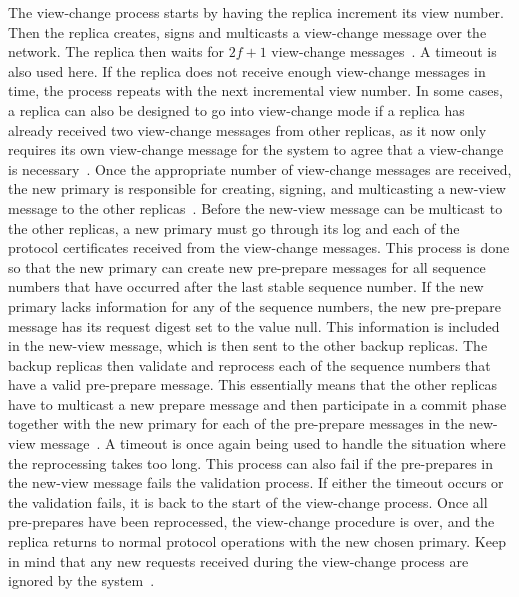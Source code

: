 The view-change process starts by having the replica increment its view number. Then the replica creates, signs and multicasts a view-change message over the network. The replica  then waits for $2f+1$ view-change messages~\cites{SLIDES:PBFT}[p.~6]{PAPER:OGPBFT}[p.~411]{PAPER:PBFTRecovery}{WEB:SawtoothPBFT}. A timeout is also used here. If the replica does not receive enough view-change messages in time, the process repeats with the next incremental view number. 
In some cases, a replica can also be designed to go into view-change mode if a replica has already received two view-change messages from other replicas, as it now only requires its own view-change message for the system to agree that a view-change is necessary~\cite{BOOK:BuildDepDistSyst}. Once the appropriate number of view-change messages are received, the new primary is responsible for creating, signing, and multicasting a new-view message to the other replicas~\cite[p.~264]{BOOK:BuildDepDistSyst}. Before the new-view message can be multicast to the other replicas, a new primary must go through its log and each of the protocol certificates received from the view-change messages. This process is done so that the new primary can create new pre-prepare messages for all sequence numbers that have occurred after the last stable sequence number. If the new primary lacks information for any of the sequence numbers, the new pre-prepare message has its request digest set to the value null. This information is included in the new-view message, which is then sent to the other backup replicas. The backup replicas then validate and reprocess each of the sequence numbers that have a valid pre-prepare message. This essentially means that the other replicas have to multicast a new prepare message and then participate in a commit phase together with the new primary for each of the pre-prepare messages in the new-view message~\cites[p.~6]{PAPER:OGPBFT}[p.~458]{BOOK:MVstandver3}[p.~265]{BOOK:BuildDepDistSyst}. A timeout is once again being used to handle the situation where the reprocessing takes too long. This process can also fail if the pre-prepares in the new-view message fails the validation process. If either the timeout occurs or the validation fails, it is back to the start of the view-change process. Once all pre-prepares have been reprocessed, the view-change procedure is over, and the replica returns to normal protocol operations with the new chosen primary. Keep in mind that any new requests received during the view-change process are ignored by the system~\cite[p.~263]{BOOK:BuildDepDistSyst}. 

